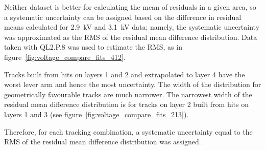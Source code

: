 Neither dataset is better for calculating the mean of residuals in a given area, so a systematic uncertainty can be assigned based on the difference in residual means calculated for 2.9~kV and 3.1~kV data; namely, the systematic uncertainty was approximated as the RMS of the residual mean difference distribution. Data taken with QL2.P.8 was used to estimate the RMS, as in figure~\ref{fig:voltage_compare_fits_412}.

Tracks built from hits on layers 1 and 2 and extrapolated to layer 4 have the worst lever arm and hence the most uncertainty. The width of the distribution for geometrically favourable tracks are much narrower. The narrowest width of the residual mean difference distribution is for tracks on layer 2 built from hits on layers 1 and 3 (see figure~\ref{fig:voltage_compare_fits_213}). 

Therefore, for each tracking combination, a systematic uncertainty equal to the RMS of the residual mean difference distribution was assigned.

